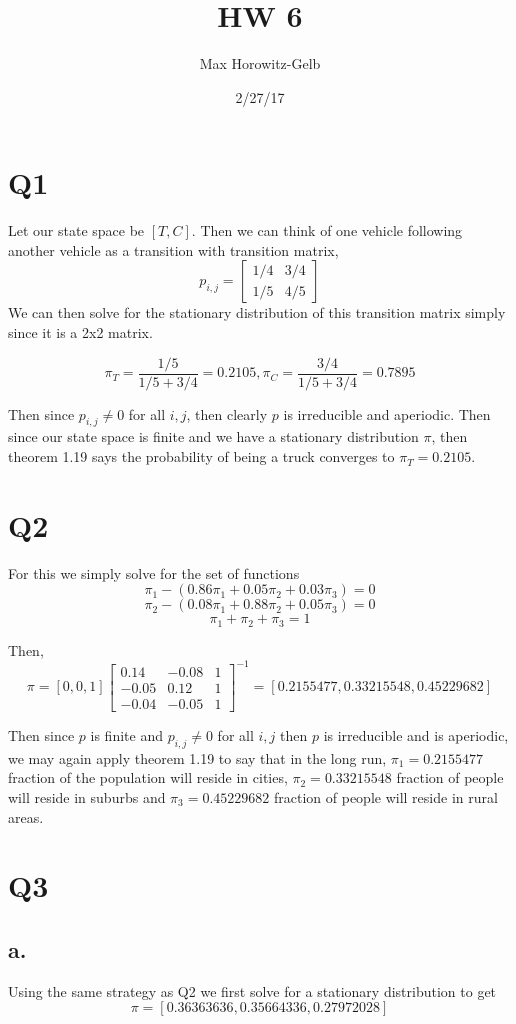 \documentclass{article}
\title{HW 6}
\date{2/27/17}
\author{Max Horowitz-Gelb}
\begin{document}
\maketitle
\section*{Q1}
Let our state space be $[T,C]$. Then we can think of one vehicle following another vehicle as a transition 
with transition matrix,
\[
p_{i,j} =
\begin{bmatrix}
1/4 & 3/4\\
1/5 & 4/5
\end{bmatrix}
\]
We can then solve for the stationary distribution of this transition matrix simply since it is a 2x2 matrix.

\[
\pi_T = \frac{1/5}{1/5 + 3/4} = 0.2105, 
\pi_C = \frac{3/4}{1/5 + 3/4} = 0.7895
\]

Then since $p_{i,j} \neq 0$ for all $i,j$, then clearly $p$ is irreducible and aperiodic. Then since our state space is finite and we have a stationary distribution $\pi$, then theorem 1.19 says the probability of being a truck converges to $\pi_T = 0.2105$. 

\section*{Q2}
For this we simply solve for the set of functions
\[
\pi_1 - (0.86\pi_1 + 0.05\pi_2 + 0.03\pi_3) = 0
\]
\[
	\pi_2 - (0.08\pi_1 + 0.88\pi_2 + 0.05 \pi_3)= 0
\]
\[
	\pi_1 + \pi_2 + \pi_3 = 1
\]

Then,
\[
\pi = [0,0,1]\begin{bmatrix}
0.14 & -0.08 & 1 \\
-0.05 & 0.12 & 1\\
-0.04 & -0.05 & 1
\end{bmatrix}^{-1} 
 = [ 0.2155477 ,  0.33215548,  0.45229682]
\]

Then since $p$ is finite and $p_{i,j} \neq 0$ for all $i,j$ then $p$  is irreducible and is aperiodic, we may again apply theorem 1.19 to say that in the long run,
$\pi_1 = 0.2155477$ fraction of the population will reside in cities, $\pi_2 = 0.33215548$ fraction of people will reside in suburbs and $\pi_3 = 0.45229682$ fraction of people will reside in rural areas.

\section*{Q3}
\subsection*{a.}
Using the same strategy as Q2 we first solve for a stationary distribution to get
\[
\pi = [ 0.36363636,  0.35664336,  0.27972028]
\]
 
\end{document}
